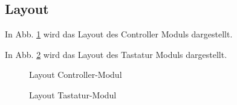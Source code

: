 \subsection{Layout}

In Abb. \ref{LayoutController} wird das Layout des Controller Moduls dargestellt.

In Abb. \ref{LayoutTastatur} wird das Layout des Tastatur Moduls dargestellt. 

\begin{figure}[H]
	\centering    
	\caption{Layout Controller-Modul}
	\label{LayoutController}
\end{figure}

\begin{figure}[H]
	\centering    
	\caption{Layout Tastatur-Modul}
	\label{LayoutTastatur}
\end{figure}


